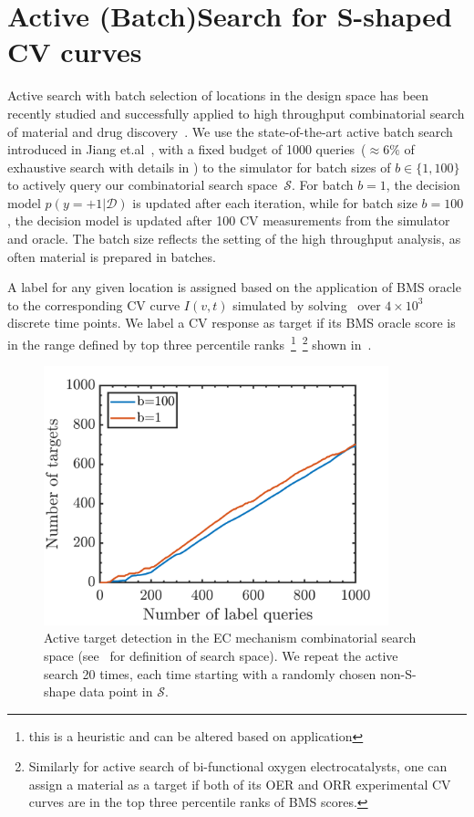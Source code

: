 \section{Active (Batch)Search for S-shaped CV curves}
Active search with batch selection of locations in the design space has been recently studied and successfully applied to  high throughput combinatorial search of material and drug discovery~\cite{jiang2018efficient}. 
We use the state-of-the-art active batch search introduced in Jiang et.al~\cite{jiang2018efficient}, with a fixed budget of 1000 queries~(\(\approx6\%\) of exhaustive search with details in ) to the simulator for batch sizes of \(b\in\{1,100\}\) to actively query our combinatorial search space~\(\mathcal{S}\).
For batch \(b=1\), the decision model \(p(y=+1|\mathcal{D})\) is updated after each iteration, while for batch size \(b=100\), the decision model is updated after 100 CV measurements from the simulator and oracle. 
The batch size reflects the setting of the high throughput analysis, as often material is prepared in batches.

A label for any given location is assigned based on the application of BMS oracle to the corresponding CV curve \(I(v,t)\) simulated by solving~ over \(4\times10^3\) discrete time points. 
We label a CV response as target if its BMS oracle score is in the range defined by top three percentile ranks~\footnote{this is a heuristic and can be altered based on application}~\footnote{Similarly for active search of bi-functional oxygen electrocatalysts, one can assign a material as a target if both of its OER and ORR experimental CV curves are in the top three percentile ranks of BMS scores. } shown in~. 

\begin{figure}[h]
    \centering
    \includegraphics[width=100mm]{Chapter-3/figures/batch_results.png}
    \caption{Active target detection in the EC mechanism combinatorial search space (see~ for definition of search space). We repeat the active search 20 times, each time starting with a randomly chosen non-S-shape data point in \(\mathcal{S}\). }
    \label{fig:batchens_fullec}
\end{figure}

